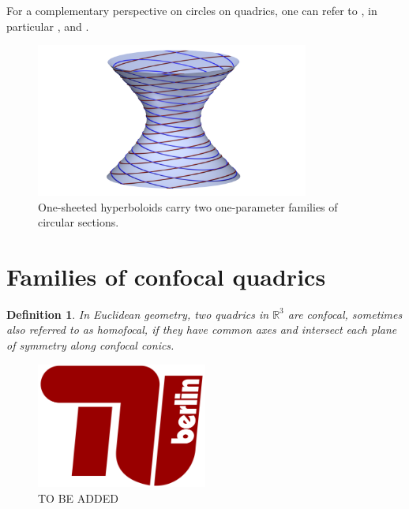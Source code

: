 \documentclass[10pt, a4paper]{article}
\theoremstyle{BoldTopSpacing}
\theoremstyle{BoldTopSpacing}
\theoremstyle{BoldTopSpacing}
\theoremstyle{BoldTopBottomSpacing}
\newtheorem{definition}{Definition}[section]
\theoremstyle{BoldTopSpacing}
\theoremstyle{BoldTopBottomSpacing}
\theoremstyle{remark}
\begin{document}
\sloppy For a complementary perspective on circles on quadrics, one can refer to \cite{nilovSurfaceContainingLine2011}, in particular \cite[\textcolor{CitationColor}{\textit{Lemma~2.1}}]{nilovSurfaceContainingLine2011}, and \cite[\textcolor{CitationColor}{\textit{Lemma~2.6}}]{nilovSurfaceContainingLine2011}.

\begin{figure}[H]
    \centering
    \includegraphics[width=0.8\textwidth]{circles_sections_of_one_sheeted_hyperboloid.png}
    \caption{One-sheeted hyperboloids carry two one-parameter families of circular sections.}
    \label{fig:circular_sections_one_sheeted}
\end{figure}

\pagebreak
\section{Families of confocal quadrics}
\label{sec:confocal-quadrics}

\begin{definition}
\label{def:confocal-quadrics}
In Euclidean geometry, two quadrics in $\mathbb{R}^3$ are \textit{confocal}, sometimes also referred to as \textit{homofocal}, if they have common axes and intersect each plane of symmetry along confocal conics.
\end{definition}

\begin{figure}[H]
    \centering
    \includegraphics[width=0.5\textwidth]{TU-Berlin-Logo.png}
    \caption{TO BE ADDED}
    \label{fig:figgg}
\end{figure}
\end{document}
